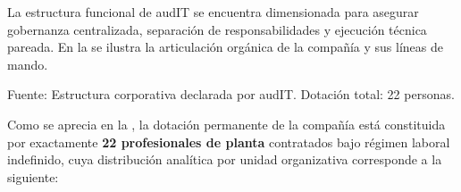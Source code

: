La estructura funcional de audIT se encuentra dimensionada para asegurar gobernanza centralizada, separación de responsabilidades y ejecución técnica pareada. En la  se ilustra la articulación orgánica de la compañía y sus líneas de mando.


Fuente: Estructura corporativa declarada por audIT. Dotación total: 22 personas.

Como se aprecia en la , la dotación permanente de la compañía está constituida por exactamente \textbf{22 profesionales de planta} contratados bajo régimen laboral indefinido, cuya distribución analítica por unidad organizativa corresponde a la siguiente:

